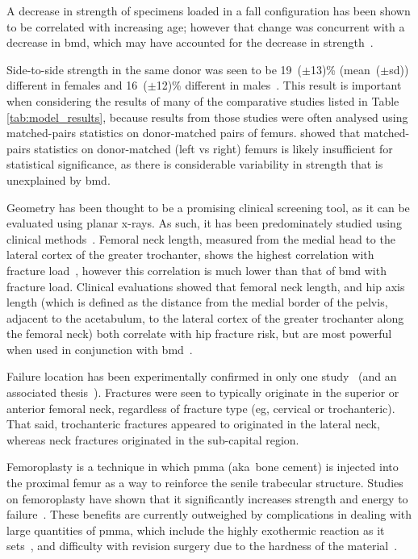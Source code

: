 A decrease in strength of specimens loaded in a fall configuration has been shown to be correlated with increasing age; however that change was concurrent with a decrease in \ac{bmd}, which may have accounted for the decrease in strength~\citep{courtney_age-related_1995, courtney_effects_1994}.

Side-to-side strength in the same donor was seen to be  19~($\pm$13)\% (mean~($\pm$\ac{sd})) different in females and 16~($\pm$12)\% different in males~\citep{eckstein_reproducibility_2004}.
This result is important when considering the results of many of the comparative studies listed in Table \ref{tab:model_results}, because results from those studies were often analysed using matched-pairs statistics on donor-matched pairs of femurs.
\citet{eckstein_reproducibility_2004} showed that matched-pairs statistics on donor-matched (left \ac{vs} right) femurs is likely insufficient for statistical significance, as there is considerable variability in strength that is unexplained by \ac{bmd}.

Geometry has been thought to be a promising clinical screening tool, as it can be evaluated using planar x-rays.
As such, it has been predominately studied using clinical methods~\citep{dincel_association_2008, el-kaissi_femoral_2005, faulkner_simple_1993, wang_women_2009}.
Femoral neck length, measured from the medial head to the lateral cortex of the greater trochanter, shows the highest correlation with fracture load~\citep{cheng_assessment_1997}, however this correlation is much lower than that of \ac{bmd} with fracture load.
Clinical evaluations showed that femoral neck length, and hip axis length (which is defined as the distance from the medial border of the pelvis, adjacent to the acetabulum, to the lateral cortex of the greater trochanter along the femoral neck) both correlate with hip fracture risk, but are most powerful when used in conjunction with \ac{bmd}~\citep{faulkner_simple_1993, dincel_association_2008}.

Failure location has been experimentally confirmed in only one study~\citep{de_bakker_during_2009} (and an associated thesis~\citep{de_bakker_hip_2006}).
Fractures were seen to typically originate in the superior or anterior femoral neck, regardless of fracture type (\ac{eg}, cervical or trochanteric).
That said, trochanteric fractures appeared to originated in the lateral neck, whereas neck fractures originated in the sub-capital region.

Femoroplasty is a technique in which \ac{pmma} (\ac{aka}\ bone cement) is injected into the proximal femur as a way to reinforce the senile trabecular structure.
Studies on femoroplasty have shown that it significantly increases strength and energy to failure~\citep{de_bakker_hip_2006, heini_femoroplasty-augmentation_2004, sutter_biomechanical_2010}.
These benefits are currently outweighed by complications in dealing with large quantities of \ac{pmma}, which include the highly exothermic reaction as it sets~\citep{de_bakker_hip_2006, heini_femoroplasty-augmentation_2004}, and difficulty with revision surgery due to the hardness of the material~\citep{beckmann_femoroplasty--augmentation_2007}.
	
